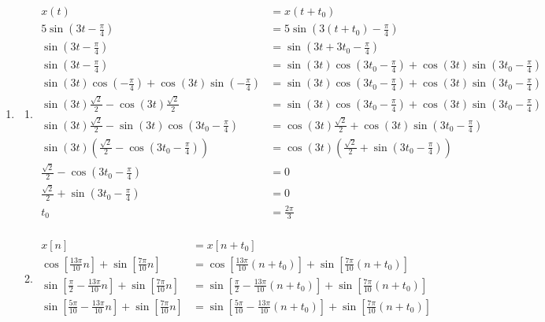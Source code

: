 \documentclass[10pt,a4paper, margin=1in]{article}
\begin{document}
\begin{enumerate}
\begin{enumerate}
    
    \end{enumerate}

\item %
    \begin{enumerate}
    \item \begin{align*}
        x(t) & = x(t + t_0) \\
        5\sin(3t - \frac{\pi}{4}) & = 5\sin(3(t + t_0) - \frac{\pi}{4})\\
        \sin(3t - \frac{\pi}{4}) & = \sin(3t + 3t_0 - \frac{\pi}{4})\\
        \sin(3t - \frac{\pi}{4}) & = \sin(3t) \cos(3t_0 - \frac{\pi}{4}) + \cos(3t) \sin(3t_0 - \frac{\pi}{4})\\
        \sin(3t) \cos(- \frac{\pi}{4}) + \cos(3t) \sin(- \frac{\pi}{4}) & = \sin(3t) \cos(3t_0 - \frac{\pi}{4}) + \cos(3t) \sin(3t_0 - \frac{\pi}{4})\\
        \sin(3t) \frac{\sqrt{2}}{2} - \cos(3t) \frac{\sqrt{2}}{2} & = \sin(3t) \cos(3t_0 - \frac{\pi}{4}) + \cos(3t) \sin(3t_0 - \frac{\pi}{4})\\
        \sin(3t) \frac{\sqrt{2}}{2} - \sin(3t) \cos(3t_0 - \frac{\pi}{4}) & = \cos(3t) \frac{\sqrt{2}}{2} + \cos(3t) \sin(3t_0 - \frac{\pi}{4})\\
        \sin(3t) \left(\frac{\sqrt{2}}{2} - \cos(3t_0 - \frac{\pi}{4})\right) & = \cos(3t) \left(\frac{\sqrt{2}}{2} + \sin(3t_0 - \frac{\pi}{4})\right)\\
        \frac{\sqrt{2}}{2} - \cos(3t_0 - \frac{\pi}{4}) & = 0\\
        \frac{\sqrt{2}}{2} + \sin(3t_0 - \frac{\pi}{4}) & = 0\\
        t_0 & = \frac{2\pi}{3}\\
    \end{align*}    
    \item \begin{align*}
        x[n] & = x[n + t_0] \\
        \cos[\frac{13\pi}{10}n] + \sin[\frac{7\pi}{10}n] & = \cos[\frac{13\pi}{10}(n + t_0)] + \sin[\frac{7\pi}{10}(n + t_0)] \\
        \sin[\frac{\pi}{2} - \frac{13\pi}{10}n] + \sin[\frac{7\pi}{10}n] & = \sin[\frac{\pi}{2} - \frac{13\pi}{10}(n + t_0)] + \sin[\frac{7\pi}{10}(n + t_0)] \\
        \sin[\frac{5\pi}{10} - \frac{13\pi}{10}n] + \sin[\frac{7\pi}{10}n] & = \sin[\frac{5 \pi}{10} - \frac{13\pi}{10}(n + t_0)] + \sin[\frac{7\pi}{10}(n + t_0)] \\

\end{align*}
\end{enumerate}
\end{enumerate}
\end{document}
